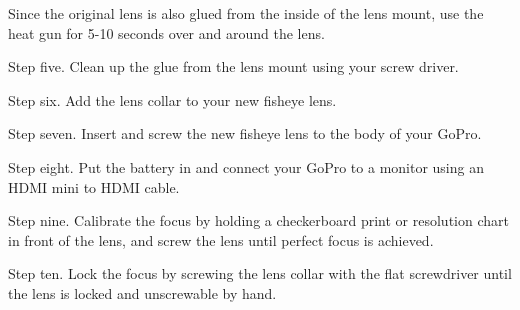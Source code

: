 \begin{fullwidth}

\tip Since the original lens is also glued from the inside of the lens mount, use the heat gun for 5-10 seconds over and around the lens. 

Step five. Clean up the glue from the lens mount using your screw driver.


Step six. Add the lens collar to your new fisheye lens.


Step seven. Insert and screw the new fisheye lens to the body of your GoPro.


Step eight. Put the battery in and connect your GoPro to a monitor using an HDMI mini to HDMI cable.


Step nine. Calibrate the focus by holding a checkerboard print or resolution chart in front of the lens, and screw the lens until perfect focus is achieved. 


Step ten. Lock the focus by screwing the lens collar with the flat screwdriver until the lens is locked and unscrewable by hand.


\clearpage
\end{fullwidth}
